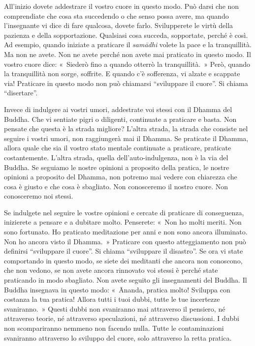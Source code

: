 All'inizio dovete addestrare il vostro cuore in questo modo. Può darsi
che non comprendiate che cosa sta succedendo o che senso possa avere, ma
quando l'insegnante vi dice di fare qualcosa, dovete farlo. Svilupperete
le virtù della pazienza e della sopportazione. Qualsiasi cosa succeda,
sopportate, perché è così. Ad esempio, quando iniziate a praticare il
\emph{samādhi} volete la pace e la tranquillità. Ma non ne avete. Non ne
avete perché non avete mai praticato in questo modo. Il vostro cuore
dice: «~Siederò fino a quando otterrò la tranquillità.~» Però, quando la
tranquillità non sorge, soffrite. E quando c'è sofferenza, vi alzate e
scappate via! Praticare in questo modo non può chiamarsi ``sviluppare il
cuore''. Si chiama ``disertare''.

Invece di indulgere ai vostri umori, addestrate voi stessi con il Dhamma
del Buddha. Che vi sentiate pigri o diligenti, continuate a praticare e
basta. Non pensate che questa è la strada migliore? L'altra strada, la
strada che consiste nel seguire i vostri umori, non raggiungerà mai il
Dhamma. Se praticate il Dhamma, allora quale che sia il vostro stato
mentale continuate a praticare, praticate costantemente. L'altra strada,
quella dell'auto-indulgenza, non è la via del Buddha. Se seguiamo le
nostre opinioni a proposito della pratica, le nostre opinioni a
proposito del Dhamma, non potremo mai vedere con chiarezza che cosa è
giusto e che cosa è sbagliato. Non conosceremo il nostro cuore. Non
conosceremo noi stessi.

Se indulgete nel seguire le vostre opinioni e cercate di praticare di
conseguenza, inizierete a pensare e a dubitare molto. Penserete: «~Non
ho molti meriti. Non sono fortunato. Ho praticato meditazione per anni e
non sono ancora illuminato. Non ho ancora visto il Dhamma.~» Praticare
con questo atteggiamento non può definirsi ``sviluppare il cuore''. Si
chiama ``sviluppare il disastro''. Se ora vi state comportando in questo
modo, se siete dei meditanti che ancora non conoscono, che non vedono,
se non avete ancora rinnovato voi stessi è perché state praticando in
modo sbagliato. Non avete seguito gli insegnamenti del Buddha. Il Buddha
insegnava in questo modo: «~Ānanda, pratica molto! Sviluppa con costanza
la tua pratica! Allora tutti i tuoi dubbi, tutte le tue incertezze
svaniranno.~» Questi dubbi non svaniranno mai attraverso il pensiero, né
attraverso teorie, né attraverso speculazioni, né attraverso
discussioni. I dubbi non scompariranno nemmeno non facendo nulla. Tutte
le contaminazioni svaniranno attraverso lo sviluppo del cuore, solo
attraverso la retta pratica.


